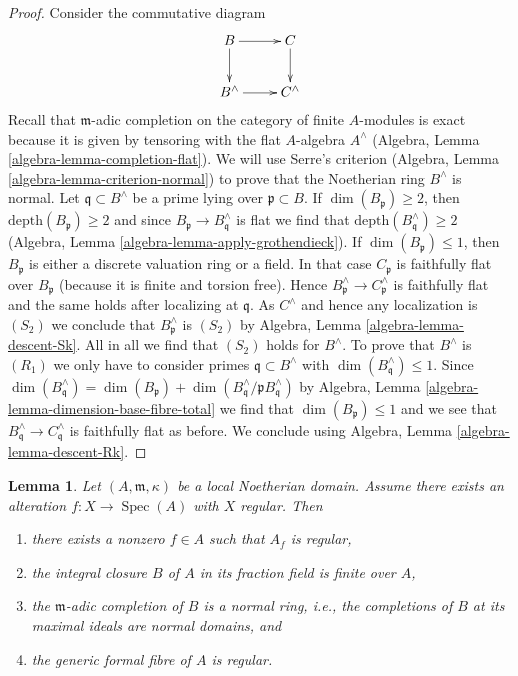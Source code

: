 \documentclass{stacks-project}
\theoremstyle{plain}
\newtheorem{lemma}[subsection]{Lemma}
\theoremstyle{definition}
\theoremstyle{remark}
\numberwithin{equation}{subsection}
\def\Spec{\mathop{\mathrm{Spec}}}
\begin{document}
\begin{proof}
Consider the commutative diagram
$$
\xymatrix{
B \ar[r] \ar[d] & C \ar[d] \\
B^\wedge \ar[r] & C^\wedge
}
$$
Recall that $\mathfrak m$-adic completion on the category of
finite $A$-modules is exact because it is given by tensoring with
the flat $A$-algebra $A^\wedge$
(Algebra, Lemma \ref{algebra-lemma-completion-flat}).
We will use Serre's criterion
(Algebra, Lemma \ref{algebra-lemma-criterion-normal})
to prove that the Noetherian ring $B^\wedge$ is normal.
Let $\mathfrak q \subset B^\wedge$ be a prime lying over
$\mathfrak p \subset B$. If $\dim(B_\mathfrak p) \geq 2$, then
$\text{depth}(B_\mathfrak p) \geq 2$ and since
$B_\mathfrak p \to B^\wedge_\mathfrak q$ is flat we find
that $\text{depth}(B^\wedge_\mathfrak q) \geq 2$
(Algebra, Lemma \ref{algebra-lemma-apply-grothendieck}).
If $\dim(B_\mathfrak p) \leq 1$, then $B_\mathfrak p$ is
either a discrete valuation ring or a field.
In that case $C_\mathfrak p$ is faithfully flat over $B_\mathfrak p$
(because it is finite and torsion free).
Hence $B^\wedge_\mathfrak p \to C^\wedge_\mathfrak p$ is
faithfully flat and the same holds after localizing at $\mathfrak q$.
As $C^\wedge$ and hence any localization is $(S_2)$ we conclude that
$B^\wedge_\mathfrak p$ is $(S_2)$ by
Algebra, Lemma \ref{algebra-lemma-descent-Sk}.
All in all we find that
$(S_2)$ holds for $B^\wedge$. To prove that $B^\wedge$ is
$(R_1)$ we only have to consider primes $\mathfrak q \subset B^\wedge$
with $\dim(B^\wedge_\mathfrak q) \leq 1$. Since
$\dim(B^\wedge_\mathfrak q) = \dim(B_\mathfrak p) +
\dim(B^\wedge_\mathfrak q/\mathfrak p B^\wedge_\mathfrak q)$ by
Algebra, Lemma \ref{algebra-lemma-dimension-base-fibre-total}
we find that $\dim(B_\mathfrak p) \leq 1$ and
we see that $B^\wedge_\mathfrak q \to C^\wedge_\mathfrak q$
is faithfully flat as before. We conclude using
Algebra, Lemma \ref{algebra-lemma-descent-Rk}.
\end{proof}

\begin{lemma}
\label{lemma-regular-alteration-implies-local}
Let $(A, \mathfrak m, \kappa)$ be a local Noetherian domain.
Assume there exists an alteration $f : X \to \Spec(A)$
with $X$ regular. Then
\begin{enumerate}
\item there exists a nonzero $f \in A$ such that $A_f$ is regular,
\item the integral closure $B$ of $A$ in its fraction field is finite over $A$,
\item the $\mathfrak m$-adic completion of $B$ is a normal ring, i.e., the
completions of $B$ at its maximal ideals are normal domains, and
\item the generic formal fibre of $A$ is regular.
\end{enumerate}
\end{lemma}
\end{document}
